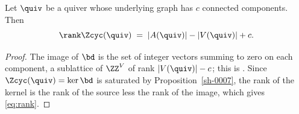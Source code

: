 \begin{theorem}[Rank]\label{sh-0009}
Let $\quiv$ be a quiver whose underlying graph has $c$ connected components. Then
\begin{equation}\label{eq:rank}
\rank \Zcyc(\quiv) \;=\; |A(\quiv)| - |V(\quiv)| + c.
\end{equation}
\end{theorem}
\begin{proof}
The image of $\bd$ is the set of integer vectors summing to zero on each component, a sublattice of $\ZZ^{V}$ of rank $|V(\quiv)| - c$; this is \cite[Proposition 2.1]{Arden24}. Since $\Zcyc(\quiv) = \ker \bd$ is saturated by Proposition~\ref{sh-0007}, the rank of the kernel is the rank of the source less the rank of the image, which gives \eqref{eq:rank}.
\end{proof}
